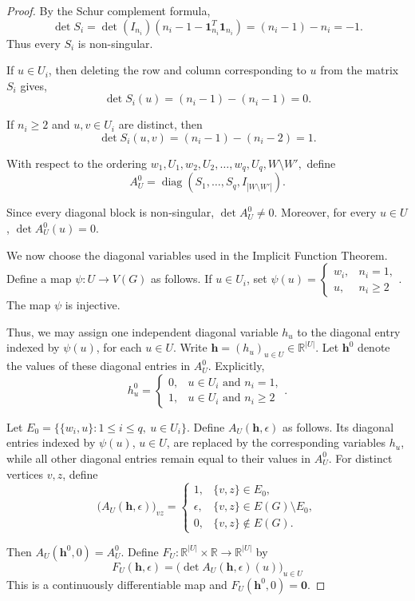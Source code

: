 \documentclass[12pt,reqno]{amsart}
\theoremstyle{plain}
\theoremstyle{definition}
\theoremstyle{block}
\theoremstyle{remark}
\numberwithin{equation}{section}
\begin{document}
\begin{proof}
By the Schur complement formula,
\[
\det S_i
=
\det(I_{n_i})
\left(
n_i-1-\mathbf 1_{n_i}^{T}\mathbf 1_{n_i}
\right)
=(n_i-1)-n_i
=-1.
\]
Thus every \(S_i\) is non-singular.

If \(u\in U_i\), then deleting the row and column corresponding to 
\(u\) from the matrix \(S_i\) gives,
\[
\det S_i(u)
=
(n_i-1)-(n_i-1)
=0.
\]

If \(n_i\geq2\) and \(u,v\in U_i\) are distinct, then
\[
\det S_i(u,v)
=
(n_i-1)-(n_i-2)
=1.
\]

With respect to the ordering
\(
w_1,U_1,w_2,U_2,\ldots,w_q,U_q,W\setminus W',
\)
define
\[
A_U^0
=
\operatorname{diag}
\left(
S_1,\ldots,S_q,I_{|W\setminus W'|}
\right).
\]

Since every diagonal block is non-singular,
\(
\det A_U^0\neq0.
\)
Moreover, for every \(u\in U\),
\(
\det A_U^0(u)=0.
\)

We now choose the diagonal variables used in the Implicit Function
Theorem. Define a map
\(
\psi:U\longrightarrow V(G)
\)
as follows. If \(u\in U_i\), set
\(
\psi(u)=
\begin{cases}
w_i, & n_i=1,\\
u,   & n_i\geq2
\end{cases}
\).
The map \(\psi\) is injective. 

Thus, we may assign one independent
diagonal variable \(h_u\) to the diagonal entry indexed by
\(\psi(u)\), for each \(u\in U\). Write
\(
\mathbf h=(h_u)_{u\in U}\in\mathbb R^{|U|}.
\)
Let \(\mathbf h^0\) denote the values of these diagonal entries in
\(A_U^0\). Explicitly,
\[
h_u^0=
\begin{cases}
0, & u\in U_i\text{ and }n_i=1,\\
1, & u\in U_i\text{ and }n_i\geq2
\end{cases}.
\]

Let
\(
E_0=\bigl\{\{w_i,u\}:1\leq i\leq q,\ u\in U_i\bigr\}.
\)
Define \(A_U(\mathbf h,\epsilon)\) as follows. Its diagonal entries
indexed by \(\psi(u)\), \(u\in U\), are replaced by the corresponding
variables \(h_u\), while all other diagonal entries remain equal to
their values in \(A_U^0\). For distinct vertices \(v,z\), define
\[
\bigl(A_U(\mathbf h,\epsilon)\bigr)_{vz}
=
\begin{cases}
1,
& \{v,z\}\in E_0,\\
\epsilon,
& \{v,z\}\in E(G)\setminus E_0,\\
0,
& \{v,z\}\notin E(G).
\end{cases}
\]

Then
\(
A_U(\mathbf h^0,0)=A_U^0.
\)
Define
\(
F_U:\mathbb R^{|U|}\times\mathbb R
\longrightarrow
\mathbb R^{|U|}
\)
by
\[
F_U(\mathbf h,\epsilon)
=
\bigl(
\det A_U(\mathbf h,\epsilon)(u)
\bigr)_{u\in U}
\]
This is a continuously differentiable map and
\(
F_U(\mathbf h^0,0)=\mathbf 0.
\)


\end{proof}
\end{document}
